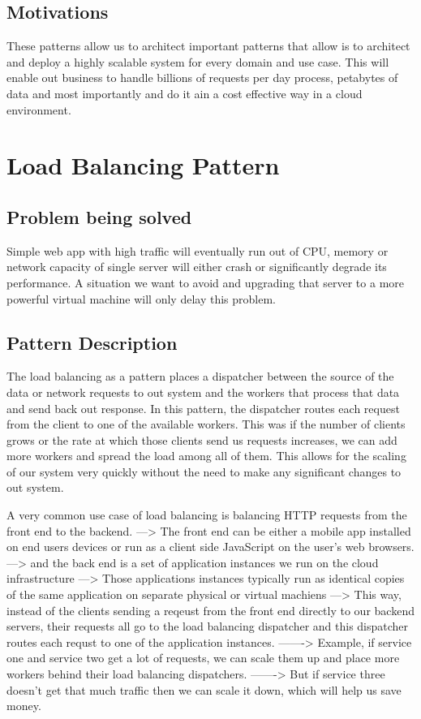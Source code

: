 \documentclass[a4paper, 11pt]{book}
\begin{document}
    \subsection{Motivations}
    These patterns allow us to architect important patterns that allow is to architect and deploy a highly scalable system for every domain and use case.
    This will enable out business to handle billions of requests per day process, petabytes of data and most importantly and do it ain a cost effective way in a cloud environment.

    \section{Load Balancing Pattern}
    \subsection{Problem being solved}
    Simple web app with high traffic will eventually run out of CPU, memory or network capacity of single server will either crash or significantly degrade its performance.
    A situation we want to avoid and upgrading that server to a more powerful virtual machine will only delay this problem.

    \subsection{Pattern Description}
    The load balancing as a pattern places a dispatcher between the source of the data or network requests to out system and the workers that process that data and send back out response.
    In this pattern, the dispatcher routes each request from the client to one of the available workers.
    This was if the number of clients grows or the rate at which those clients send us requests increases, we can add more workers and spread the load among all of them.
    This allows for the scaling of our system very quickly without the need to make any significant changes to out system.

    A very common use case of load balancing is balancing HTTP requests from the front end to the backend.
    ---> The front end can be either a mobile app installed on end users devices or run as a client side JavaScript on the user's web browsers.
    ---> and the back end is a set of application instances we run on the cloud infrastructure
    ---> Those applications instances typically run as identical copies of the same application on separate physical or virtual machiens
    ---> This way, instead of the clients sending a reqeust from the front end directly to our backend servers, their requests all go to the load balancing dispatcher and this dispatcher routes each requst to one of the application instances.
    -------> Example, if service one and service two get a lot of requests, we can scale them up and place more workers behind their load balancing dispatchers.
    -------> But if service three doesn't get that much traffic then we can scale it down, which will help us save money.
\end{document}
